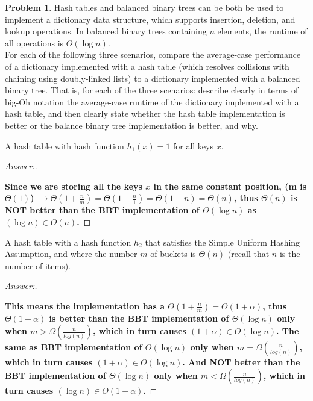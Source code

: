 \documentclass[11pt]{article}
\theoremstyle{definition}
\theoremstyle{definition}
\newtheorem{required}{Problem}
\theoremstyle{definition}
\begin{document}
\begin{required} \label{Hash3}
Hash tables and balanced binary trees can be both be used to implement a dictionary data structure, which supports insertion, deletion, and lookup operations. In balanced binary trees containing $n$ elements, the runtime of all operations is $\Theta(\log n)$.  \\

\noindent For each of the following three scenarios, compare the average-case performance of a dictionary implemented with a hash table (which resolves collisions with chaining using doubly-linked lists) to a dictionary implemented with a balanced binary tree. That is, for each of the three scenarios: describe clearly in terms of big-Oh notation the average-case runtime of the dictionary implemented with a hash table, and then clearly state whether the hash table implementation is better or the balance binary tree implementation is better, and why.
	
\begin{enumerate}[label=(\alph*)]
\item A hash table with hash function $h_1(x)=1$ for all keys $x$.

\begin{proof}[Answer:] \
\item \textbf{Since we are storing all the keys $x$ in the same constant position, (m is $\Theta(1)$) $\to \Theta(1 + \frac{n}{m}) = \Theta(1 + \frac{n}{1}) = \Theta(1 + n) = \Theta(n)$, thus $\Theta(n)$ is NOT better than the BBT implementation of $\Theta(\log n)$ as $(\log n) \in O(n)$.}
\end{proof}


\vskip 15pt
\item A hash table with a hash function $h_2$ that satisfies the Simple Uniform Hashing Assumption, and where the number $m$ of buckets is $\Theta(n)$ (recall that $n$ is the number of items).
\begin{proof}[Answer:] \
\item \textbf{This means the implementation has a $\Theta(1 + \frac{n}{m}) = \Theta(1 + \alpha)$, thus $\Theta(1 + \alpha)$ is better than the BBT implementation of $\Theta(\log n)$ only when $m > \Omega(\frac{n}{log (n)})$, which in turn causes $(1 + \alpha) \in O(\log n)$. The same as BBT implementation of $\Theta(\log n)$ only when $m = \Omega(\frac{n}{log (n)})$, which in turn causes $(1 + \alpha) \in \Theta(\log n)$. And NOT better than the BBT implementation of $\Theta(\log n)$ only when $m < \Omega(\frac{n}{log (n)})$, which in turn causes $(\log n) \in O(1 + \alpha)$.}
\end{proof}



\end{enumerate}
\end{required}
\end{document}
